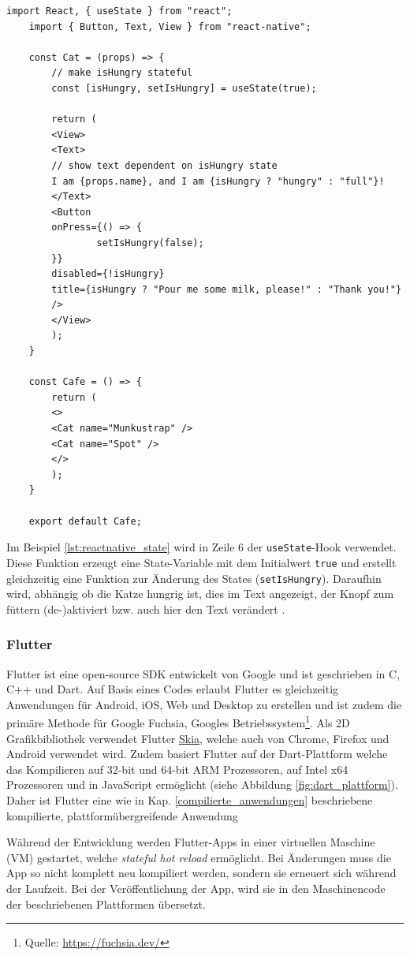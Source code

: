 \begin{lstlisting}[caption=State mit \texttt{useState} Hook, label=lst:reactnative_state]
	import React, { useState } from "react";
	import { Button, Text, View } from "react-native";
	
	const Cat = (props) => {
		// make isHungry stateful
		const [isHungry, setIsHungry] = useState(true);
		
		return (
		<View>
		<Text>
		// show text dependent on isHungry state
		I am {props.name}, and I am {isHungry ? "hungry" : "full"}!
		</Text>
		<Button
		onPress={() => {
				setIsHungry(false);
		}}
		disabled={!isHungry}
		title={isHungry ? "Pour me some milk, please!" : "Thank you!"}
		/>
		</View>
		);
	}
	
	const Cafe = () => {
		return (
		<>
		<Cat name="Munkustrap" />
		<Cat name="Spot" />
		</>
		);
	}
	
	export default Cafe;
\end{lstlisting}

\noindent
Im Beispiel \ref{lst:reactnative_state} wird in Zeile 6 der \texttt{useState}-Hook verwendet. Diese Funktion erzeugt eine State-Variable mit dem Initialwert \texttt{true} und erstellt gleichzeitig eine Funktion zur Änderung des States (\texttt{setIsHungry}). Daraufhin wird, abhängig ob die Katze hungrig ist, dies im Text angezeigt, der Knopf zum füttern (de-)aktiviert bzw. auch hier den Text verändert \cite{reactnative2021}.\\

\subsubsection{Flutter}
\label{flutter}
Flutter ist eine open-source SDK entwickelt von Google und ist geschrieben in C, C++ und Dart.
Auf Basis eines Codes erlaubt Flutter es gleichzeitig Anwendungen für Android, iOS, Web und Desktop zu erstellen und ist zudem die primäre Methode für Google Fuchsia, Googles Betriebssystem\footnote{Quelle: \url{https://fuchsia.dev/}}.
Als 2D Grafikbibliothek verwendet Flutter  \href{https://skia.org/}{Skia}, welche auch von Chrome, Firefox und Android verwendet wird. Zudem basiert Flutter auf der Dart-Plattform welche das Kompilieren auf 32-bit und 64-bit ARM Prozessoren, auf Intel x64 Prozessoren und in JavaScript ermöglicht (siehe Abbildung \ref{fig:dart_plattform}). Daher ist Flutter eine wie in Kap. \ref{compilierte_anwendungen} beschriebene kompilierte, plattformübergreifende Anwendung

\noindent
Während der Entwicklung werden Flutter-Apps in einer virtuellen Maschine (VM) gestartet, welche \textit{stateful hot reload} ermöglicht. Bei Änderungen muss die App so nicht komplett neu kompiliert werden, sondern sie erneuert sich während der Laufzeit. Bei der Veröffentlichung der App, wird sie in den Maschinencode der beschriebenen Plattformen übersetzt.\\

